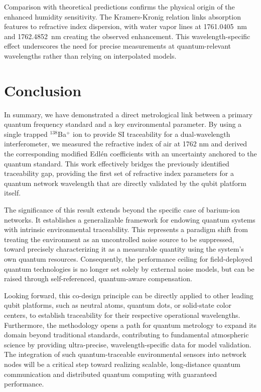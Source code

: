 \documentclass[aps,pra,reprint,groupedaddress,twocolumn,superscriptaddress,linenumbers]{revtex4-2}
\begin{document}
Comparison with theoretical predictions confirms the physical origin of the enhanced humidity sensitivity. The Kramers-Kronig relation links absorption features to refractive index dispersion, with water vapor lines at \SI{1761.0405}{\nano\meter} and \SI{1762.4852}{\nano\meter} creating the observed enhancement. This wavelength-specific effect underscores the need for precise measurements at quantum-relevant wavelengths rather than relying on interpolated models.

\section*{Conclusion}

In summary, we have demonstrated a direct metrological link between a primary quantum frequency standard and a key environmental parameter. By using a single trapped $^{138}$Ba$^+$ ion to provide SI traceability for a dual-wavelength interferometer, we measured the refractive index of air at 1762 nm and derived the corresponding modified Edlén coefficients with an uncertainty anchored to the quantum standard. This work effectively bridges the previously identified traceability gap, providing the first set of refractive index parameters for a quantum network wavelength that are directly validated by the qubit platform itself.

The significance of this result extends beyond the specific case of barium-ion networks. It establishes a generalizable framework for endowing quantum systems with intrinsic environmental traceability. This represents a paradigm shift from treating the environment as an uncontrolled noise source to be suppressed, toward precisely characterizing it as a measurable quantity using the system's own quantum resources. Consequently, the performance ceiling for field-deployed quantum technologies is no longer set solely by external noise models, but can be raised through self-referenced, quantum-aware compensation.

Looking forward, this co-design principle can be directly applied to other leading qubit platforms, such as neutral atoms, quantum dots, or solid-state color centers, to establish traceability for their respective operational wavelengths. Furthermore, the methodology opens a path for quantum metrology to expand its domain beyond traditional standards, contributing to fundamental atmospheric science by providing ultra-precise, wavelength-specific data for model validation. The integration of such quantum-traceable environmental sensors into network nodes will be a critical step toward realizing scalable, long-distance quantum communication and distributed quantum computing with guaranteed performance.
\end{document}
